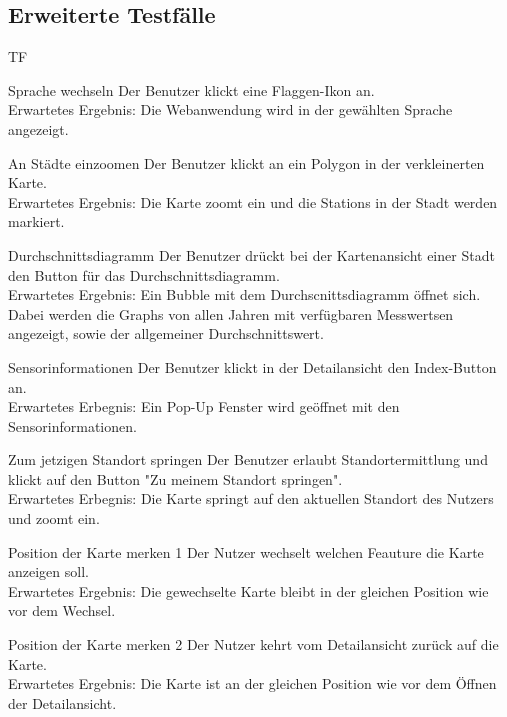 \subsection{Erweiterte Testfälle}
\begin{Kriterien}{TF}
	
	\item[Sprache wechseln] Der Benutzer klickt eine Flaggen-Ikon an. \\ Erwartetes Ergebnis: Die Webanwendung wird in der gewählten Sprache angezeigt.
	
	\item[An Städte einzoomen] Der Benutzer klickt an ein Polygon in der verkleinerten Karte. \\ Erwartetes Ergebnis: Die Karte zoomt ein und die \glspl{Station} in der Stadt werden markiert.
	
	\item[Durchschnittsdiagramm] Der Benutzer drückt bei der Kartenansicht einer Stadt den Button für das Durchschnittsdiagramm. \\ Erwartetes Ergebnis: Ein Bubble mit dem Durchscnittsdiagramm öffnet sich. Dabei werden die \glspl{Graph} von allen Jahren mit verfügbaren \glspl{Messwert}en angezeigt, sowie der allgemeiner Durchschnittswert.
	
	\item[Sensorinformationen] Der Benutzer klickt in der Detailansicht den Index-Button an. \\ Erwartetes Erbegnis: Ein Pop-Up Fenster
wird geöffnet mit den Sensorinformationen.

	\item[Zum jetzigen Standort springen] Der Benutzer erlaubt Standortermittlung und klickt auf den Button "Zu meinem Standort springen". \\ Erwartetes Erbegnis: Die Karte springt auf den aktuellen Standort des Nutzers und zoomt ein.
	
	\item[Position der Karte merken 1] Der Nutzer wechselt welchen Feauture die Karte anzeigen soll. \\ 
	Erwartetes Ergebnis: Die gewechselte Karte bleibt in der gleichen Position wie vor dem Wechsel.
	
	\item[Position der Karte merken 2] Der Nutzer kehrt vom Detailansicht zurück auf die Karte. \\ 
	Erwartetes Ergebnis: Die Karte ist an der gleichen Position wie vor dem Öffnen der Detailansicht.
	
\end{Kriterien}
